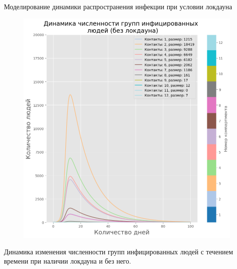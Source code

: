 \documentclass[10pt, unicode, xcolor={svgnames, table, hyperref}]{beamer}
\begin{document}
\begin{frame}{Моделирование динамики распространения инфекции при условии локдауна}
\begin{figure}[h!]
\begin{minipage}{0.49\textwidth}
			\includegraphics[width=1.0\textwidth]{img/sir_model_nonlockdown_urban_I_new.png}
		\end{minipage}
	\end{figure}
	Динамика изменения численности групп инфицированных людей с течением времени
	при наличии локдауна и без него.
\end{frame}
\end{document}
